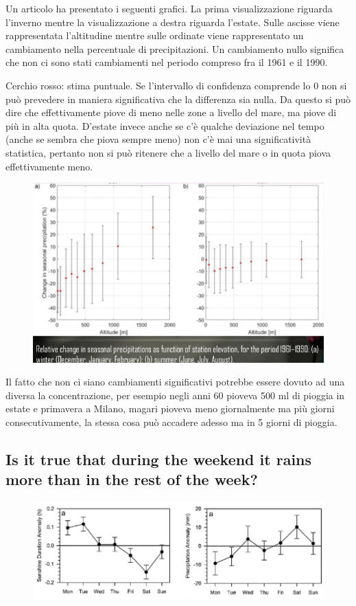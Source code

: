 \documentclass[12pt,a4paper]{report}
\begin{document}
Un articolo ha presentato i seguenti grafici. La prima visualizzazione riguarda l'inverno mentre la visualizzazione a destra riguarda l'estate. Sulle ascisse viene rappresentata l'altitudine mentre sulle ordinate viene rappresentato un cambiamento nella percentuale di precipitazioni. Un cambiamento nullo significa che non ci sono stati cambiamenti nel periodo compreso fra il 1961 e il 1990. 

Cerchio rosso: stima puntuale. Se l'intervallo di confidenza comprende lo 0 non si può prevedere in maniera significativa che la differenza sia nulla. Da questo si può dire che effettivamente piove di meno nelle zone a livello del mare, ma piove di più in alta quota. D'estate invece anche se c'è qualche deviazione nel tempo (anche se sembra che piova sempre meno) non c'è mai una significatività statistica, pertanto non si può ritenere che a livello del mare o in quota piova effettivamente meno. 

\begin{figure} [h]
	\centering
	\includegraphics[width=0.4\linewidth]{imgs datavis/Rain.png}
	\caption{}
	\label{fig:rain}
\end{figure} 

Il fatto che non ci siano cambiamenti significativi potrebbe essere dovuto ad una diversa la concentrazione, per esempio negli anni 60 pioveva 500 ml di pioggia in estate e primavera a Milano, magari pioveva meno giornalmente ma più giorni consecutivamente, la stessa cosa può accadere adesso ma in 5 giorni di pioggia. 

\subsection{Is it true that during the weekend it rains more than in the rest of the week?}

\begin{figure} [h]
	\centering
	\includegraphics[width=0.5\linewidth]{imgs datavis/Rain during week.png}
	\caption{}
	\label{fig:rain during week}
\end{figure} 
\end{document}
